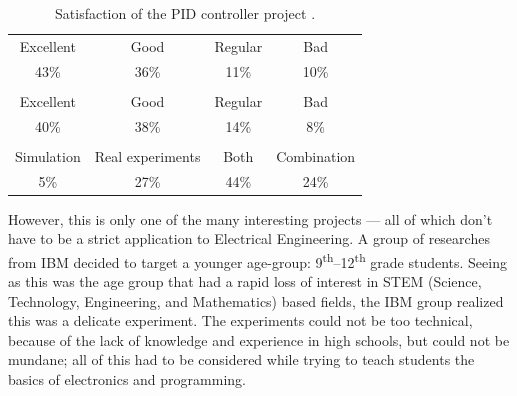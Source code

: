 \documentclass[11pt,letterpaper,twocolumn]{article}
\begin{document}
\begin{table}[!h]
  \begin{tabularx}{\linewidth}{|C|C|C|C|}
    \hline {}
     \\
    \hline

    Excellent & Good & Regular & Bad \\
    43\% & 36\% & 11\% & 10\% \\

    \hline {}
     \\
    \hline

    Excellent & Good & Regular & Bad \\
    40\% & 38\% & 14\% & 8\% \\

    \hline {}
     \\
    \hline

    \footnotesize Simulation & \footnotesize Real experiments & \footnotesize Both & \footnotesize Combination \\
    5\% & 27\% & 44\% & 24\% \\ \hline

  \end{tabularx}

  \caption{Satisfaction of the PID controller project \cite{engineering}.}
\end{table}

However, this is only one of the many interesting projects --- all of which don't have to be a strict application to Electrical Engineering. A group of researches from IBM decided to target a younger age-group: \num{9}\textsuperscript{th}--\num{12}\textsuperscript{th} grade students. Seeing as this was the age group that had a rapid loss of interest in STEM (Science, Technology, Engineering, and Mathematics) based fields, the IBM group realized this was a delicate experiment. The experiments could not be too technical, because of the lack of knowledge and experience in high schools, but could not be mundane; all of this had to be considered while trying to teach students the basics of electronics and programming.
\end{document}
